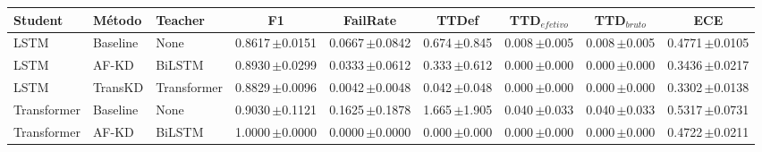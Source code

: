 \begin{tabular}{lllcccccc}
\toprule
Student & Método & Teacher & F1 & FailRate & TTDef & TTD$_{efetivo}$ & TTD$_{bruto}$ & ECE \\
\midrule
LSTM & Baseline & None & 0.8617\,{\tiny$\pm$0.0151} & 0.0667\,{\tiny$\pm$0.0842} & 0.674\,{\tiny$\pm$0.845} & 0.008\,{\tiny$\pm$0.005} & 0.008\,{\tiny$\pm$0.005} & 0.4771\,{\tiny$\pm$0.0105} \\
LSTM & AF-KD & BiLSTM & 0.8930\,{\tiny$\pm$0.0299} & 0.0333\,{\tiny$\pm$0.0612} & 0.333\,{\tiny$\pm$0.612} & 0.000\,{\tiny$\pm$0.000} & 0.000\,{\tiny$\pm$0.000} & 0.3436\,{\tiny$\pm$0.0217} \\
LSTM & TransKD & Transformer & 0.8829\,{\tiny$\pm$0.0096} & 0.0042\,{\tiny$\pm$0.0048} & 0.042\,{\tiny$\pm$0.048} & 0.000\,{\tiny$\pm$0.000} & 0.000\,{\tiny$\pm$0.000} & 0.3302\,{\tiny$\pm$0.0138} \\
Transformer & Baseline & None & 0.9030\,{\tiny$\pm$0.1121} & 0.1625\,{\tiny$\pm$0.1878} & 1.665\,{\tiny$\pm$1.905} & 0.040\,{\tiny$\pm$0.033} & 0.040\,{\tiny$\pm$0.033} & 0.5317\,{\tiny$\pm$0.0731} \\
Transformer & AF-KD & BiLSTM & 1.0000\,{\tiny$\pm$0.0000} & 0.0000\,{\tiny$\pm$0.0000} & 0.000\,{\tiny$\pm$0.000} & 0.000\,{\tiny$\pm$0.000} & 0.000\,{\tiny$\pm$0.000} & 0.4722\,{\tiny$\pm$0.0211} \\
\bottomrule
\end{tabular}